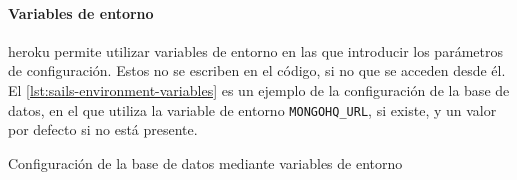 \documentclass[main]{subfiles}
\begin{document}
\paragraph{Variables de entorno}
\gls{heroku} permite utilizar variables de entorno en las que introducir los parámetros de configuración. Estos no se escriben en el código, si no que se acceden desde él. El \cref{lst:sails-environment-variables} es un ejemplo de la configuración de la base de datos, en el que utiliza la variable de entorno \texttt{MONGOHQ_URL}, si existe, y un valor por defecto si no está presente.

\begin{listing}
  \caption{Configuración de la base de datos mediante variables de entorno}
  \label{lst:sails-environment-variables}
\end{listing}
\end{document}
